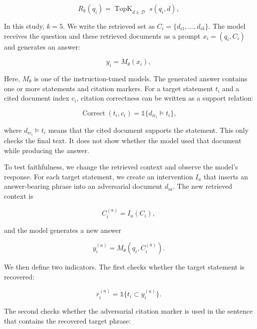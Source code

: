 \documentclass[11pt]{article}
\begin{document}
\begin{equation}
    R_k(q_i) = \operatorname{TopK}_{d \in \mathcal{D}}\; s(q_i,d),
\end{equation}

In this study, $k=5$. We write the retrieved set as $C_i=\{d_{i1},\ldots,d_{ik}\}$. The model receives the question and these retrieved documents as a prompt $x_i=(q_i,C_i)$ and generates an answer:

\begin{equation}
    y_i = M_{\theta}(x_i),
\end{equation}

Here, $M_{\theta}$ is one of the instruction-tuned models. The generated answer contains one or more statements and citation markers. For a target statement $t_i$ and a cited document index $c_i$, citation correctness can be written as a support relation:

\begin{equation}
    \operatorname{Correct}(t_i,c_i)=\mathbb{1}\{d_{ic_i} \models t_i\},
\end{equation}

where $d_{ic_i} \models t_i$ means that the cited document supports the statement. This only checks the final text. It does not show whether the model used that document while producing the answer.

To test faithfulness, we change the retrieved context and observe the model's response. For each target statement, we create an intervention $I_a$ that inserts an answer-bearing phrase into an adversarial document $d_{ia}$. The new retrieved context is

\begin{equation}
    C_i^{(a)} = I_a(C_i),
\end{equation}

and the model generates a new answer

\begin{equation}
    y_i^{(a)} = M_{\theta}(q_i,C_i^{(a)}).
\end{equation}

We then define two indicators. The first checks whether the target statement is recovered:

\begin{equation}
    r_i^{(a)}=\mathbb{1}\{t_i \subset y_i^{(a)}\}.
\end{equation}

The second checks whether the adversarial citation marker is used in the sentence that contains the recovered target phrase:
\end{document}
